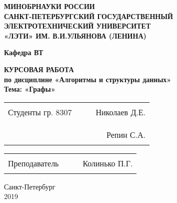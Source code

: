 \begin{titlepage}
\begin{center}
    \uppercase{\textbf{Минобрнауки России\\
            Санкт-Петербургский государственный\\
            электротехнический университет\\
            «ЛЭТИ» им. В.И.Ульянова (Ленина)
    }}
    \vspace{0.25cm}

    \textbf{Кафедра ВТ}
    \vfill

    \uppercase{\textbf{\large{
        Курсовая работа
    }}}
    \\
    \textbf{\large{
      по дисциплине «Алгоритмы и структуры данных»\\
      Тема: «Графы»
    }}
  \bigskip
\end{center}
\vfill

\noindent
\begin{tabularx}{\textwidth}{@{}lcXr}
    Студенты гр. 8307 & \hspace{1.6cm} & \rule{5cm}{1pt} & Николаев Д.Е. \\
    \\
                     & \hspace{1.6cm} & \rule{5cm}{1pt} & Репин С.А.
\end{tabularx}

\vspace{0.5cm}

\noindent
\begin{tabularx}{\textwidth}{@{}lcXr}
    Преподаватель & \hspace{2cm} & \rule{5cm}{1pt} & Колинько П.Г.
\end{tabularx}

\hfill \break
\hfill \break

\begin{center}
  Санкт-Петербург\\2019
\end{center}

\end{titlepage}
